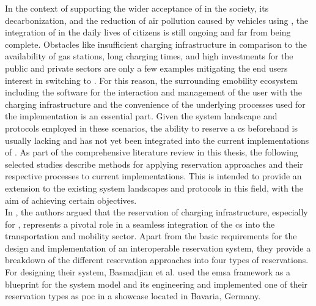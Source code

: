 In the context of supporting the wider acceptance of  in the society, its decarbonization, and the reduction of air pollution caused by vehicles using  \cite{basmadjian_reference_2020}, the integration of  in the daily lives of citizens is still ongoing and far from being complete.
Obstacles like insufficient charging infrastructure in comparison to the availability of gas stations, long charging times, and high investments for the public and private sectors \cite{basmadjian_reference_2020,orcioni_ev_2020} are only a few examples mitigating the end users interest in switching to .
For this reason, the surrounding \acrshort{emobility} ecosystem including the software for the interaction and management of the user with the charging infrastructure and the convenience of the underlying processes used for the implementation is an essential part.
Given the system landscape and protocols employed in these scenarios, the ability to reserve a \acrshort{cs} beforehand is usually lacking and has not yet been integrated into the current implementations of .
As part of the comprehensive literature review in this thesis, the following selected studies describe methods for applying reservation approaches and their respective processes to current implementations. This is intended to provide an extension to the existing system landscapes and protocols in this field, with the aim of achieving certain objectives. \\
\noindent In \cite{basmadjian_interoperable_2019}, the authors argued that the reservation of charging infrastructure, especially for , represents a pivotal role in a seamless integration of the \acrshort{cs} into the transportation and mobility sector.
Apart from the basic requirements for the design and implementation of an interoperable reservation system, they provide a breakdown of the different reservation approaches into four types of reservations. 
For designing their system, Basmadjian et al. used the \acrshort{emsa} \cite{kirpes_e-mobility_2019} framework as a blueprint for the system model and its engineering and implemented one of their reservation types as \acrshort{poc} in a showcase located in Bavaria, Germany.
